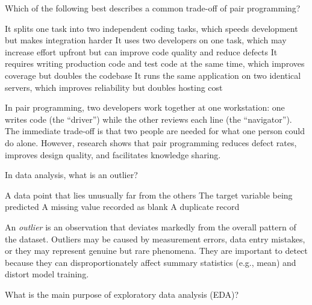 \documentclass[answers]{exam}
\begin{document}
\begin{questions}
\question Which of the following best describes a common trade-off of pair programming?

\begin{choices}
    \choice It splits one task into two independent coding tasks, which speeds development but makes integration harder
    \correctchoice It uses two developers on one task, which may increase effort upfront but can improve code quality and reduce defects
    \choice It requires writing production code and test code at the same time, which improves coverage but doubles the codebase
    \choice It runs the same application on two identical servers, which improves reliability but doubles hosting cost
\end{choices}

\begin{solution}
    In pair programming, two developers work together at one workstation: one writes code (the ``driver'') while the other reviews each line (the ``navigator'').
    The immediate trade-off is that two people are needed for what one person could do alone.
    However, research shows that pair programming reduces defect rates, improves design quality, and facilitates knowledge sharing.
\end{solution}

\question In data analysis, what is an outlier?

\begin{choices}
    \correctchoice A data point that lies unusually far from the others
    \choice The target variable being predicted
    \choice A missing value recorded as blank
    \choice A duplicate record
\end{choices}

\begin{solution}
    An \textit{outlier} is an observation that deviates markedly from the overall pattern of the dataset.
    Outliers may be caused by measurement errors, data entry mistakes, or they may represent genuine but rare phenomena.
    They are important to detect because they can disproportionately affect summary statistics (e.g., mean) and distort model training.
\end{solution}

\question What is the main purpose of exploratory data analysis (EDA)?


\end{questions}
\end{document}
